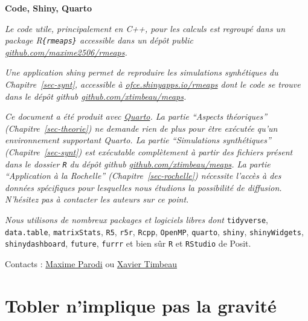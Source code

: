 \documentclass[
  10pt,
  a4paper,
  numbers=noendperiod,
  DIV=9]{scrartcl}
\begin{document}
\begin{tcolorbox}[enhanced jigsaw, opacityback=0, rightrule=.15mm, breakable, colframe=quarto-callout-tip-color-frame, left=2mm, toprule=.15mm, bottomrule=.15mm, arc=.35mm, colback=white, leftrule=.75mm]

\textbf{Code, Shiny, Quarto}\vspace{2mm}

\emph{Le code utile, principalement en C++, pour les calculs est
regroupé dans un package R\texttt{\{rmeaps\}} accessible dans un dépôt
public
\href{https://github.com/Maxime2506/rmeaps}{github.com/maxime2506/rmeaps}.}

\emph{Une application shiny permet de reproduire les simulations
synhétiques du Chapitre~\ref{sec-synt}, accessible à
\href{https://ofce.shinyapps.io/rmeaps}{ofce.shinyapps.io/rmeaps} dont
le code se trouve dans le dépôt github
\href{https://github.com/xtimbeau/meaps}{github.com/xtimbeau/meaps}.}

\emph{Ce document a été produit avec \href{https://quarto.org}{Quarto}.
La partie ``Aspects théoriques'' (Chapitre~\ref{sec-theorie}) ne demande
rien de plus pour être exécutée qu'un environnement supportant Quarto.
La partie ``Simulations synthétiques'' (Chapitre~\ref{sec-synt}) est
exécutable complètement à partir des fichiers présent dans le dossier
\texttt{R} du dépôt github
\href{https://github.com/xtimbeau/meaps}{github.com/xtimbeau/meaps}. La
partie ``Application à la Rochelle'' (Chapitre~\ref{sec-rochelle})
nécessite l'accès à des données spécifiques pour lesquelles nous
étudions la possibilité de diffusion. N'hésitez pas à contacter les
auteurs sur ce point.}

\emph{Nous utilisons de nombreux packages et logiciels libres dont}
\texttt{tidyverse}, \texttt{data.table}, \texttt{matrixStats},
\texttt{R5}, \texttt{r5r}, \texttt{Rcpp}, \texttt{OpenMP},
\texttt{quarto}, \texttt{shiny}, \texttt{shinyWidgets},
\texttt{shinydashboard}, \texttt{future}, \texttt{furrr} et bien sûr
\texttt{R} et \texttt{RStudio} de Posit.

\end{tcolorbox}

Contacts : \href{mailto:maxime.parodi@sciencespo.fr}{Maxime Parodi} ou
\href{xavier.timbeau@sciencespo.fr}{Xavier Timbeau}


\hypertarget{tobler-nimplique-pas-la-gravituxe9}{%
\chapter{Tobler n'implique pas la
gravité}\label{tobler-nimplique-pas-la-gravituxe9}}
\end{document}
